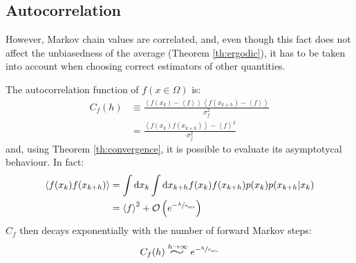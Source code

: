 \subsection*{Autocorrelation}
However, Markov chain values are correlated,
and, even though this fact does not affect the unbiasedness of the average (Theorem \ref{th:ergodic}),
it has to be taken into account when choosing correct estimators of other quantities.%

The autocorrelation function of $f(x\in\Omega)$ is:
\begin{align*}
    C_f(h) &\equiv \frac{\left<f(x_k)-\left<f\right>\right>\left<f(x_{k+h})-\left<f\right>\right>}{\sigma_f^2} \\
           &= \frac{\left<f(x_k)f(x_{k+h})\right>-\left<f\right>^2}{\sigma_f^2}
\end{align*}
and, using Theorem \ref{th:convergence}, it is possible to evaluate its asymptotycal behaviour.
In fact:
\begin{align*}
    \left<f(x_k)f(x_{k+h})\right> &= \int\mathrm dx_k\int\mathrm dx_{k+h}f(x_k)f(x_{k+h})p(x_k)p(x_{k+h}|x_k) \\
                                  &= \left<f\right>^2 + \mathcal O\left(e^{-\sfrac{h}{\tau_\mathrm{mix}}}\right)
\end{align*}
$C_f$ then decays exponentially with the number of forward Markov steps:
\begin{equation}\label{eq:autocorr_decay}
    C_f(h) \stackrel{h\to\infty}{\scalebox{2}[1.25]{$\sim$}} e^{-\sfrac{h}{\tau_\mathrm{mix}}}
\end{equation}

